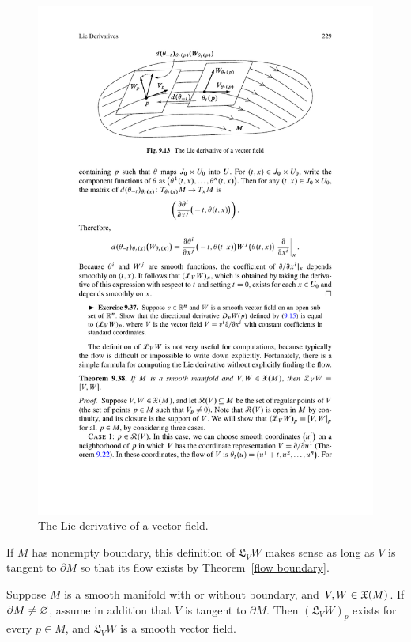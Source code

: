 \begin{figure}[htbp]
\centering
\includegraphics{pictures/Lie-derivative}
\caption{The Lie derivative of a vector field.}
\end{figure}\par
If $M$ has nonempty boundary, this definition of $\mathfrak{L}_VW$ makes sense as long as $V$ is tangent to $\partial M$ so that its flow exists by Theorem~\ref{flow boundary}.
\begin{lemma}\label{Lie derivative exist}
Suppose $M$ is a smooth manifold with or without boundary, and $V,W\in\mathfrak{X}(M)$. If $\partial M\neq\varnothing$, assume in addition that $V$ is tangent to $\partial M$. Then $(\mathfrak{L}_VW)_p$ exists for every $p\in M$, and $\mathfrak{L}_VW$ is a smooth vector field.
\end{lemma}
